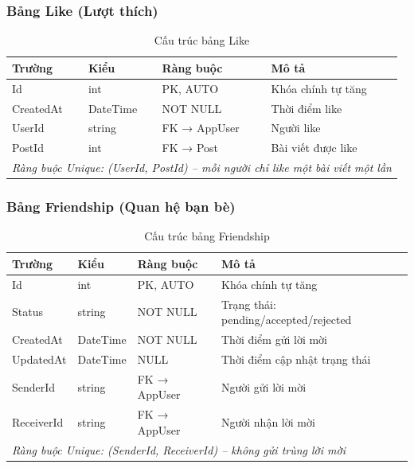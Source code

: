 \documentclass[a4paper]{article}
\begin{document}
\subsubsection{Bảng Like (Lượt thích)}

\begin{table}[h!]
\centering
\caption{Cấu trúc bảng Like}
\begin{tabularx}{\textwidth}{|l|l|l|X|}
\hline
\textbf{Trường} & \textbf{Kiểu} & \textbf{Ràng buộc} & \textbf{Mô tả} \\
\hline
Id & int & PK, AUTO & Khóa chính tự tăng \\
\hline
CreatedAt & DateTime & NOT NULL & Thời điểm like \\
\hline
UserId & string & FK → AppUser & Người like \\
\hline
PostId & int & FK → Post & Bài viết được like \\
\hline
\multicolumn{4}{|l|}{\textit{Ràng buộc Unique: (UserId, PostId) -- mỗi người chỉ like một bài viết một lần}} \\
\hline
\end{tabularx}
\end{table}

\subsubsection{Bảng Friendship (Quan hệ bạn bè)}

\begin{table}[h!]
\centering
\caption{Cấu trúc bảng Friendship}
\begin{tabularx}{\textwidth}{|l|l|l|X|}
\hline
\textbf{Trường} & \textbf{Kiểu} & \textbf{Ràng buộc} & \textbf{Mô tả} \\
\hline
Id & int & PK, AUTO & Khóa chính tự tăng \\
\hline
Status & string & NOT NULL & Trạng thái: pending/accepted/rejected \\
\hline
CreatedAt & DateTime & NOT NULL & Thời điểm gửi lời mời \\
\hline
UpdatedAt & DateTime & NULL & Thời điểm cập nhật trạng thái \\
\hline
SenderId & string & FK → AppUser & Người gửi lời mời \\
\hline
ReceiverId & string & FK → AppUser & Người nhận lời mời \\
\hline
\multicolumn{4}{|l|}{\textit{Ràng buộc Unique: (SenderId, ReceiverId) -- không gửi trùng lời mời}} \\
\hline
\end{tabularx}
\end{table}
\end{document}
